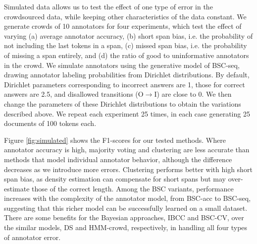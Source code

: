 Simulated data allows us to test the effect of one  
type of error in the crowdsourced data,
while keeping other characteristics of the data constant.
We generate crowds of 10 annotators for four experiments, which  
test the effect of varying
(a) average annotator accuracy,
(b) short span bias, i.e. the probability of not including the last tokens in a span, 
(c) missed span bias, i.e. the probability of missing a span entirely,
and (d) the ratio of good to uninformative annotators in the crowd.
We simulate annotators using the generative model of BSC-seq, 
drawing annotator labeling probabilities from Dirichlet distributions. 
By default, Dirichlet parameters corresponding to incorrect answers are 1,
those for correct answers are 2.5, and disallowed transitions (O$\rightarrow$I) are close to 0. 
We then change the parameters of these Dirichlet distributions 
to obtain the variations described above. 
We repeat each experiment 25 times, in each case generating 25 documents of 100 tokens each. 

Figure \ref{fig:simulated} shows the F1-scores for our tested methods. 
Where annotator accuracy is high, majority voting and clustering are less accurate than  methods that model individual annotator behavior, although the difference decreases as we introduce more errors.
Clustering performs better with high short span bias, 
as density estimation can compensate for short spans but may over-estimate
those of the correct length.
Among the BSC variants, performance increases with the complexity of the annotator model, from BSC-acc to BSC-seq,
suggesting that this richer model can be successfully learned on a small dataset. 
There are some benefits for the Bayesian approaches, IBCC and BSC-CV, over the similar  models, DS and HMM-crowd, respectively, in handling all four types of annotator error.

